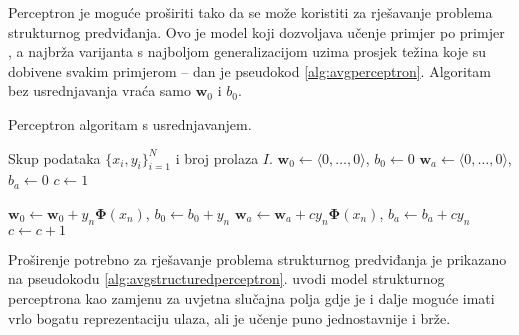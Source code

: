 Perceptron \citep{rosenblatt1958perceptron} je moguće proširiti tako da se može
koristiti za rješavanje problema strukturnog predviđanja. Ovo je model koji
dozvoljava učenje primjer po primjer , a najbrža varijanta
s najboljom generalizacijom uzima prosjek težina koje su dobivene svakim
primjerom \citep{freund1999large,gentile2002new} -- dan je pseudokod
\ref{alg:avgperceptron}. Algoritam bez usrednjavanja vraća samo $\mathbf{w}_0$ i
$b_0$.

\begin{algorithm}
\caption{Perceptron algoritam s usrednjavanjem.}\label{alg:avgperceptron}
\begin{algorithmic}[1]
\Require Skup podataka $\{x_i, y_i\}_{i=1}^N$ i broj prolaza $I$.
\State $\mathbf{w}_0 \gets \langle 0, \ldots, 0 \rangle$, $b_0 \gets 0$
\State $\mathbf{w}_a \gets \langle 0, \ldots, 0 \rangle$, $b_a \gets 0$
\State $c \gets 1$


    \State $\mathbf{w}_0 \gets \mathbf{w}_0 + y_n \mathbf{\Phi}(x_n)$, $b_0 \gets b_0 + y_n$
    \State $\mathbf{w}_a \gets \mathbf{w}_a + c y_n \mathbf{\Phi}(x_n)$, $b_a \gets b_a + c y_n$
    \EndIf
    \State $c \gets c + 1$
  \EndFor

\EndFor

\State {}
\end{algorithmic}
\end{algorithm}

Proširenje potrebno za rješavanje problema strukturnog predviđanja je prikazano
na pseudokodu \ref{alg:avgstructuredperceptron}.
\citet{collins2002discriminative} uvodi model strukturnog perceptrona
 kao zamjenu za uvjetna slučajna polja gdje je i
dalje moguće imati vrlo bogatu reprezentaciju ulaza, ali je učenje puno
jednostavnije i brže.

